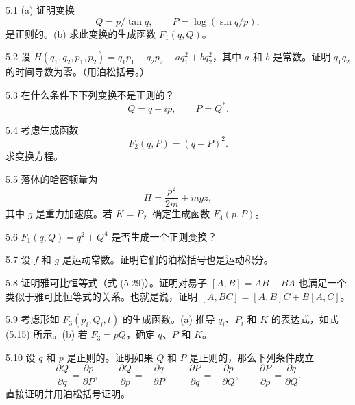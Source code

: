 5.1 (a) 证明变换
$$
Q = p/\tan q, \qquad P = \log(\sin q/p),
$$
是正则的。(b) 求此变换的生成函数 $F_1(q, Q)$。

5.2 设 $H(q_1, q_2, p_1, p_2) = q_1 p_1 - q_2 p_2 - aq_1^2 + bq_2^2$，其中 $a$ 和 $b$ 是常数。证明 $q_1 q_2$ 的时间导数为零。（用泊松括号。）

5.3 在什么条件下下列变换不是正则的？
$$
Q = q + ip, \qquad P = Q^{*}.
$$

5.4 考虑生成函数
$$
F_2(q, P) = (q + P)^2.
$$
求变换方程。

5.5 落体的哈密顿量为
$$
H = \frac{p^2}{2m} + mgz,
$$
其中 $g$ 是重力加速度。若 $K = P$，确定生成函数 $F_4(p, P)$。

5.6 $F_1(q, Q) = q^2 + Q^4$ 是否生成一个正则变换？

5.7 设 $f$ 和 $g$ 是运动常数。证明它们的泊松括号也是运动积分。

5.8 证明雅可比恒等式（式 (5.29)）。证明对易子 $[A, B] = AB - BA$ 也满足一个类似于雅可比恒等式的关系。也就是说，证明 $[A, BC] = [A, B]C + B[A, C]$。

5.9 考虑形如 $F_3(p_i, Q_i, t)$ 的生成函数。(a) 推导 $q_i$、$P_i$ 和 $K$ 的表达式，如式 (5.15) 所示。(b) 若 $F_3 = pQ$，确定 $q$、$P$ 和 $K$。

5.10 设 $q$ 和 $p$ 是正则的。证明如果 $Q$ 和 $P$ 是正则的，那么下列条件成立
$$
\frac{\partial Q}{\partial q} = \frac{\partial p}{\partial P}, \qquad
\frac{\partial Q}{\partial p} = -\frac{\partial q}{\partial P}, \qquad
\frac{\partial P}{\partial q} = -\frac{\partial p}{\partial Q}, \qquad
\frac{\partial P}{\partial p} = \frac{\partial q}{\partial Q}.
$$
直接证明并用泊松括号证明。
